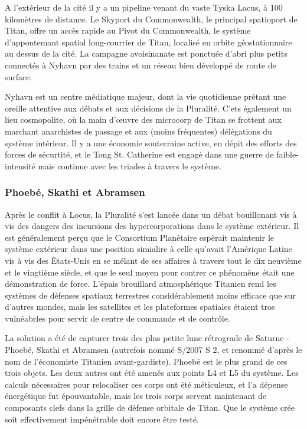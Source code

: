                                                                     A l'extérieur de la cité il y a un pipeline venant du vaste Tyska Lacus, à 100 kilomètres de distance. Le Skyport du Commonwealth, le principal spatioport de Titan, offre un accès rapide au Pivot du Commonwealth, le système d'appontemant spatial long-courrier de Titan, localisé en orbite géostationnaire au dessus de la cité. La campagne avoisinanate est ponctuée d'abri plus petits connectés à Nyhavn par des trains et un réseau bien développé de route de surface. 

                                                                     Nyhavn est un centre médiatique majeur, dont la vie quotidienne prétant une oreille attentive aux débats et aux décisions de la Pluralité. C'ets également un lieu cosmopolite, où la main d'œuvre des microcorp de Titan se frottent aux marchant anarchistes de passage et aux (moins fréquentes) délégations du système intérieur. Il y a une économie souterraine active, en dépit des efforts des forces de sécurtité, et le Tong St. Catherine est engagé dans une guerre de faible-intensité mais continue avec les triades à travers le système. 

                                                                     \subsubsection{Phoebé, Skathi et Abramsen} \label{sec:phoebe-skathi-abrams} 

                                                                     Après le conflit à Locus, la Pluralité s'est lancée dans un débat bouillonant vis à vis des dangers des incursions des hypercorporations dans le système extérieur. Il est généralement perçu que le Consortium Planétaire espèrait maintenir le système extérieur dans une position simialire à celle qu'avait l'Amérique Latine vis à vis des Êtats-Unis en se mélant de ses affaires à travers tout le dix neuvième et le vingtième siècle, et que le seul moyen pour contrer ce phénomène était une démonstration de force. L'épais brouillard atmosphérique Titanien rend les systèmes de défenses spatiaux terrestres considérablement moins efficace que sur d'autres mondes, mais les satellites et les plateformes spatiales étaient tros vulnéabrles pour servir de centre de commande et de contrôle. 

                                                                     La solution a été de capturer trois des plus petite lune rétrograde de Saturne - Phoebé, Skathi et Abramsen (autrefois nommé S/2007 S 2, et renommé d'après le nom de l'économiste Titanien avant-gardiste). Phoebé est le plus grand de ces trois objets. Les deux autres ont été amenés aux points L4 et L5 du système. Les calculs nécessaires pour relocaliser ces corps ont été méticuleux, et l'a dépense énergétique fut épouvantable, mais les trois corps servent maintenant de composants clefs dans la grille de défense orbitale de Titan. Que le système crée soit effectivement impénétrable doit encore être testé. 


